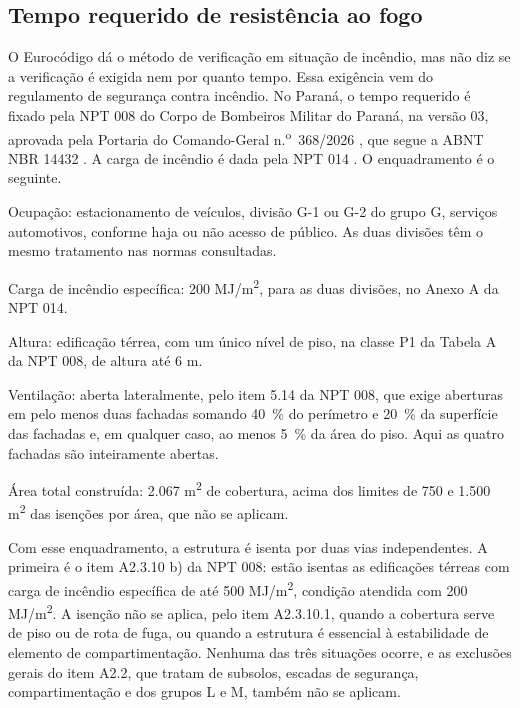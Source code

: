 \subsection{Tempo requerido de resistência ao fogo}\label{ssec:trrf}

O Eurocódigo dá o método de verificação em situação de incêndio, mas não diz se
a verificação é exigida nem por quanto tempo. Essa exigência vem do regulamento
de segurança contra incêndio. No Paraná, o tempo requerido é fixado pela NPT 008
do Corpo de Bombeiros Militar do Paraná, na versão 03, aprovada pela Portaria
do Comando-Geral n.\textsuperscript{o}~368/2026 \cite{CBMPR-NPT008:2026}, que
segue a ABNT NBR 14432 \cite{NBR14432:2001}. A carga de incêndio é dada pela
NPT 014 \cite{CBPMPR-NPT014:2020}. O enquadramento é o seguinte.

\begin{alineas}
    \item Ocupação: estacionamento de veículos, divisão G-1 ou G-2 do grupo G,
          serviços automotivos, conforme haja ou não acesso de público. As duas
          divisões têm o mesmo tratamento nas normas consultadas.
    \item Carga de incêndio específica: 200 MJ/m\textsuperscript{2}, para as duas
          divisões, no Anexo A da NPT 014.
    \item Altura: edificação térrea, com um único nível de piso, na classe P1 da
          Tabela A da NPT 008, de altura até 6 m.
    \item Ventilação: aberta lateralmente, pelo item 5.14 da NPT 008, que exige
          aberturas em pelo menos duas fachadas somando 40~\% do perímetro e 20~\%
          da superfície das fachadas e, em qualquer caso, ao menos 5~\% da área do
          piso. Aqui as quatro fachadas são inteiramente abertas.
    \item Área total construída: 2.067 m\textsuperscript{2} de cobertura, acima dos
          limites de 750 e 1.500 m\textsuperscript{2} das isenções por área, que
          não se aplicam.
\end{alineas}

Com esse enquadramento, a estrutura é isenta por duas vias independentes. A
primeira é o item A2.3.10 b) da NPT 008: estão isentas as edificações térreas com
carga de incêndio específica de até 500 MJ/m\textsuperscript{2}, condição atendida
com 200 MJ/m\textsuperscript{2}. A isenção não se aplica, pelo item A2.3.10.1,
quando a cobertura serve de piso ou de rota de fuga, ou quando a estrutura é
essencial à estabilidade de elemento de compartimentação. Nenhuma das três
situações ocorre, e as exclusões gerais do item A2.2, que tratam de subsolos,
escadas de segurança, compartimentação e dos grupos L e M, também não se
aplicam.


